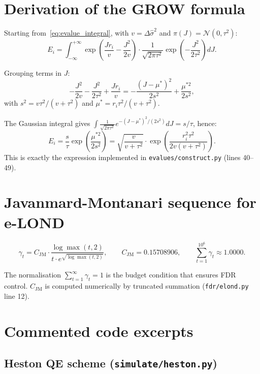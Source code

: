 \documentclass[11pt,a4paper]{article}
\theoremstyle{plain}
\theoremstyle{definition}
\theoremstyle{remark}
\newcommand{\dt}{\Delta}
\begin{document}
\appendix

\section{Derivation of the GROW formula}
\label{ann:grow}

Starting from~\eqref{eq:evalue_integral}, with $v = \dt\hat{\sigma}^2$ and
$\pi(J) = \mathcal{N}(0, \tau^2)$:
\[
  E_i = \int_{-\infty}^{+\infty}
    \exp\!\left(\frac{Jr_i}{v} - \frac{J^2}{2v}\right)
    \cdot \frac{1}{\sqrt{2\pi\tau^2}}\exp\!\left(-\frac{J^2}{2\tau^2}\right) dJ.
\]

Grouping terms in $J$:
\[
  -\frac{J^2}{2v} - \frac{J^2}{2\tau^2} + \frac{Jr_i}{v}
  = -\frac{(J - \mu^*)^2}{2s^2} + \frac{\mu^{*2}}{2s^2},
\]
with $s^2 = v\tau^2/(v+\tau^2)$ and $\mu^* = r_i\tau^2/(v+\tau^2)$.

The Gaussian integral gives $\int \frac{1}{\sqrt{2\pi\tau^2}} e^{-(J-\mu^*)^2/(2s^2)} dJ = s/\tau$, hence:
\[
  E_i = \frac{s}{\tau} \exp\!\left(\frac{\mu^{*2}}{2s^2}\right)
  = \sqrt{\frac{v}{v+\tau^2}} \cdot \exp\!\left(\frac{r_i^2\tau^2}{2v(v+\tau^2)}\right).
\]
This is exactly the expression implemented in \texttt{evalues/construct.py}
(lines 40--49).

\section{Javanmard-Montanari sequence for e-LOND}
\label{ann:jm}

\[
  \gamma_t = C_\mathrm{JM} \cdot \frac{\log\max(t,2)}{t \cdot e^{\sqrt{\log\max(t,2)}}},
  \qquad C_\mathrm{JM} = 0.15708906,
  \qquad \sum_{t=1}^{10^6} \gamma_t \approx 1.0000.
\]

The normalisation $\sum_{t=1}^\infty \gamma_t = 1$ is the budget condition
that ensures FDR control. $C_\mathrm{JM}$ is computed numerically by
truncated summation (\texttt{fdr/elond.py} line 12).

\section{Commented code excerpts}
\label{ann:code}

\subsection{Heston QE scheme (\texttt{simulate/heston.py})}
\end{document}
